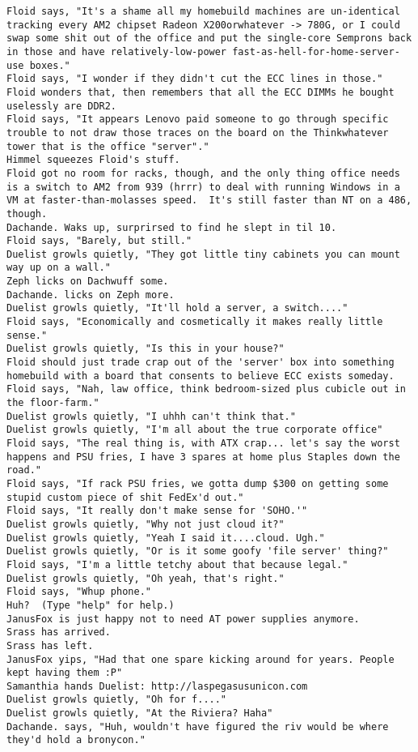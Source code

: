 \begin{verbatim}
Floid says, "It's a shame all my homebuild machines are un-identical tracking every AM2 chipset Radeon X200orwhatever -> 780G, or I could swap some shit out of the office and put the single-core Semprons back in those and have relatively-low-power fast-as-hell-for-home-server-use boxes."
Floid says, "I wonder if they didn't cut the ECC lines in those."
Floid wonders that, then remembers that all the ECC DIMMs he bought uselessly are DDR2.
Floid says, "It appears Lenovo paid someone to go through specific trouble to not draw those traces on the board on the Thinkwhatever tower that is the office "server"."
Himmel squeezes Floid's stuff.
Floid got no room for racks, though, and the only thing office needs is a switch to AM2 from 939 (hrrr) to deal with running Windows in a VM at faster-than-molasses speed.  It's still faster than NT on a 486, though.
Dachande. Waks up, surprirsed to find he slept in til 10.
Floid says, "Barely, but still."
Duelist growls quietly, "They got little tiny cabinets you can mount way up on a wall."
Zeph licks on Dachwuff some.
Dachande. licks on Zeph more.
Duelist growls quietly, "It'll hold a server, a switch...."
Floid says, "Economically and cosmetically it makes really little sense."
Duelist growls quietly, "Is this in your house?"
Floid should just trade crap out of the 'server' box into something homebuild with a board that consents to believe ECC exists someday.
Floid says, "Nah, law office, think bedroom-sized plus cubicle out in the floor-farm."
Duelist growls quietly, "I uhhh can't think that."
Duelist growls quietly, "I'm all about the true corporate office"
Floid says, "The real thing is, with ATX crap... let's say the worst happens and PSU fries, I have 3 spares at home plus Staples down the road."
Floid says, "If rack PSU fries, we gotta dump $300 on getting some stupid custom piece of shit FedEx'd out."
Floid says, "It really don't make sense for 'SOHO.'"
Duelist growls quietly, "Why not just cloud it?"
Duelist growls quietly, "Yeah I said it....cloud. Ugh."
Duelist growls quietly, "Or is it some goofy 'file server' thing?"
Floid says, "I'm a little tetchy about that because legal."
Duelist growls quietly, "Oh yeah, that's right."
Floid says, "Whup phone."
Huh?  (Type "help" for help.)
JanusFox is just happy not to need AT power supplies anymore.
Srass has arrived.
Srass has left.
JanusFox yips, "Had that one spare kicking around for years. People kept having them :P"
Samanthia hands Duelist: http://laspegasusunicon.com
Duelist growls quietly, "Oh for f...."
Duelist growls quietly, "At the Riviera? Haha"
Dachande. says, "Huh, wouldn't have figured the riv would be where they'd hold a bronycon."

\end{verbatim}
